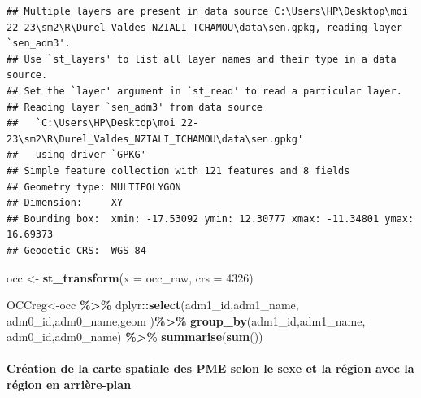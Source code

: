 \documentclass[
]{article}
\newenvironment{Shaded}{\begin{snugshade}}{\end{snugshade}}
\newcommand{\AttributeTok}[1]{\textcolor[rgb]{0.13,0.29,0.53}{#1}}
\newcommand{\DecValTok}[1]{\textcolor[rgb]{0.00,0.00,0.81}{#1}}
\newcommand{\FunctionTok}[1]{\textcolor[rgb]{0.13,0.29,0.53}{\textbf{#1}}}
\newcommand{\NormalTok}[1]{#1}
\newcommand{\OtherTok}[1]{\textcolor[rgb]{0.56,0.35,0.01}{#1}}
\newcommand{\SpecialCharTok}[1]{\textcolor[rgb]{0.81,0.36,0.00}{\textbf{#1}}}
\begin{document}
\begin{verbatim}
## Multiple layers are present in data source C:\Users\HP\Desktop\moi 22-23\sm2\R\Durel_Valdes_NZIALI_TCHAMOU\data\sen.gpkg, reading layer `sen_adm3'.
## Use `st_layers' to list all layer names and their type in a data source.
## Set the `layer' argument in `st_read' to read a particular layer.
## Reading layer `sen_adm3' from data source 
##   `C:\Users\HP\Desktop\moi 22-23\sm2\R\Durel_Valdes_NZIALI_TCHAMOU\data\sen.gpkg' 
##   using driver `GPKG'
## Simple feature collection with 121 features and 8 fields
## Geometry type: MULTIPOLYGON
## Dimension:     XY
## Bounding box:  xmin: -17.53092 ymin: 12.30777 xmax: -11.34801 ymax: 16.69373
## Geodetic CRS:  WGS 84
\end{verbatim}

\begin{Shaded}
\begin{Highlighting}[]
\NormalTok{occ }\OtherTok{\textless{}{-}} \FunctionTok{st\_transform}\NormalTok{(}\AttributeTok{x =}\NormalTok{ occ\_raw, }\AttributeTok{crs =} \DecValTok{4326}\NormalTok{)}

\NormalTok{OCCreg}\OtherTok{\textless{}{-}}\NormalTok{occ }\SpecialCharTok{\%\textgreater{}\%} 
\NormalTok{          dplyr}\SpecialCharTok{::}\FunctionTok{select}\NormalTok{(adm1\_id,adm1\_name, adm0\_id,adm0\_name,geom )}\SpecialCharTok{\%\textgreater{}\%} 
              \FunctionTok{group\_by}\NormalTok{(adm1\_id,adm1\_name, adm0\_id,adm0\_name) }\SpecialCharTok{\%\textgreater{}\%} 
                  \FunctionTok{summarise}\NormalTok{(}\FunctionTok{sum}\NormalTok{())}
\end{Highlighting}
\end{Shaded}

\hfill\break

\hypertarget{cruxe9ation-de-la-carte-spatiale-des-pme-selon-le-sexe-et-la-ruxe9gion-avec-la-ruxe9gion-en-arriuxe8re-plan}{%
\paragraph{Création de la carte spatiale des PME selon le sexe et la
région avec la région en
arrière-plan}\label{cruxe9ation-de-la-carte-spatiale-des-pme-selon-le-sexe-et-la-ruxe9gion-avec-la-ruxe9gion-en-arriuxe8re-plan}}

\hfill\break
\end{document}

